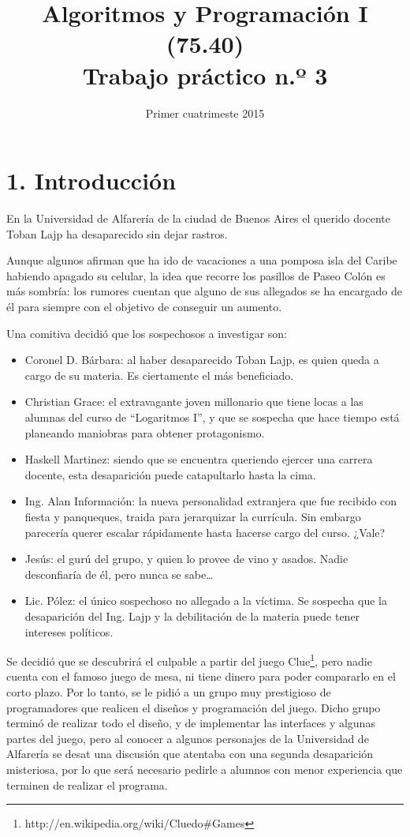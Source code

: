 \documentclass[12pt,spanish,]{article}
\title{Algoritmos y Programación I (75.40)\\Trabajo práctico n.º 3}
\date{Primer cuatrimeste 2015}
\begin{document}
\maketitle

\section{1. Introducción}\label{introducciuxf3n}

En la Universidad de Alfarería de la ciudad de Buenos Aires el querido
docente Toban Lajp ha desaparecido sin dejar rastros.

Aunque algunos afirman que ha ido de vacaciones a una pomposa isla del
Caribe habiendo apagado su celular, la idea que recorre los pasillos de
Paseo Colón es más sombría: los rumores cuentan que alguno de sus
allegados se ha encargado de él para siempre con el objetivo de
conseguir un aumento.

Una comitiva decidió que los sospechosos a investigar son:

\begin{itemize}
\itemsep1pt\parskip0pt
\item
  Coronel D. Bárbara: al haber desaparecido Toban Lajp, es quien queda a
  cargo de su materia. Es ciertamente el más beneficiado.
\item
  Christian Grace: el extravagante joven millonario que tiene locas a
  las alumnas del curso de ``Logaritmos I'', y que se sospecha que hace
  tiempo está planeando maniobras para obtener protagonismo.
\item
  Haskell Martinez: siendo que se encuentra queriendo ejercer una
  carrera docente, esta desaparición puede catapultarlo hasta la cima.
\item
  Ing. Alan Información: la nueva personalidad extranjera que fue
  recibido con fiesta y panqueques, traida para jerarquizar la
  currícula. Sin embargo parecería querer escalar rápidamente hasta
  hacerse cargo del curso. ¿Vale?
\item
  Jesús: el gurú del grupo, y quien lo provee de vino y asados. Nadie
  desconfiaría de él, pero nunca se sabe\ldots{}
\item
  Lic. Pólez: el único sospechoso no allegado a la víctima. Se sospecha
  que la desaparición del Ing. Lajp y la debilitación de la materia
  puede tener intereses políticos.
\end{itemize}

Se decidió que se descubrirá el culpable a partir del juego
Clue\footnote{http://en.wikipedia.org/wiki/Cluedo\#Games}, pero nadie
cuenta con el famoso juego de mesa, ni tiene dinero para poder
compararlo en el corto plazo. Por lo tanto, se le pidió a un grupo muy
prestigioso de programadores que realicen el diseños y programación del
juego. Dicho grupo terminó de realizar todo el diseño, y de implementar
las interfaces y algunas partes del juego, pero al conocer a algunos
personajes de la Universidad de Alfarería se desat una discusión que
atentaba con una segunda desaparición misteriosa, por lo que será
necesario pedirle a alumnos con menor experiencia que terminen de
realizar el programa.
\end{document}
